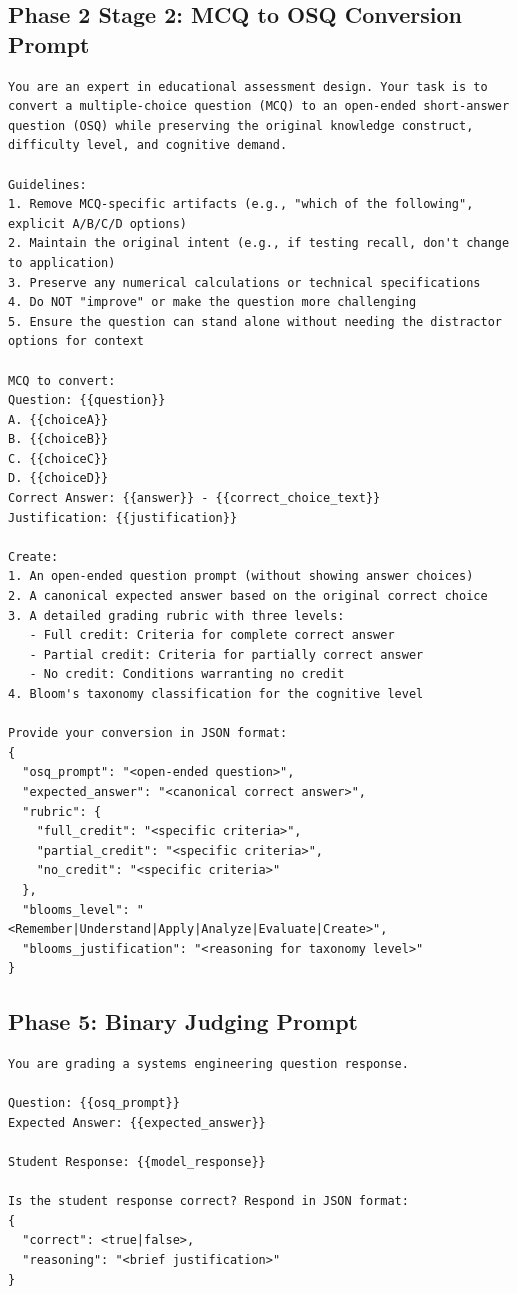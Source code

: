 \subsection{Phase 2 Stage 2: MCQ to OSQ Conversion Prompt}

\begin{lstlisting}[basicstyle=\small\ttfamily,breaklines=true]
You are an expert in educational assessment design. Your task is to convert a multiple-choice question (MCQ) to an open-ended short-answer question (OSQ) while preserving the original knowledge construct, difficulty level, and cognitive demand.

Guidelines:
1. Remove MCQ-specific artifacts (e.g., "which of the following", explicit A/B/C/D options)
2. Maintain the original intent (e.g., if testing recall, don't change to application)
3. Preserve any numerical calculations or technical specifications
4. Do NOT "improve" or make the question more challenging
5. Ensure the question can stand alone without needing the distractor options for context

MCQ to convert:
Question: {{question}}
A. {{choiceA}}
B. {{choiceB}}
C. {{choiceC}}
D. {{choiceD}}
Correct Answer: {{answer}} - {{correct_choice_text}}
Justification: {{justification}}

Create:
1. An open-ended question prompt (without showing answer choices)
2. A canonical expected answer based on the original correct choice
3. A detailed grading rubric with three levels:
   - Full credit: Criteria for complete correct answer
   - Partial credit: Criteria for partially correct answer
   - No credit: Conditions warranting no credit
4. Bloom's taxonomy classification for the cognitive level

Provide your conversion in JSON format:
{
  "osq_prompt": "<open-ended question>",
  "expected_answer": "<canonical correct answer>",
  "rubric": {
    "full_credit": "<specific criteria>",
    "partial_credit": "<specific criteria>",
    "no_credit": "<specific criteria>"
  },
  "blooms_level": "<Remember|Understand|Apply|Analyze|Evaluate|Create>",
  "blooms_justification": "<reasoning for taxonomy level>"
}
\end{lstlisting}

\subsection{Phase 5: Binary Judging Prompt}

\begin{lstlisting}[basicstyle=\small\ttfamily,breaklines=true]
You are grading a systems engineering question response.

Question: {{osq_prompt}}
Expected Answer: {{expected_answer}}

Student Response: {{model_response}}

Is the student response correct? Respond in JSON format:
{
  "correct": <true|false>,
  "reasoning": "<brief justification>"
}
\end{lstlisting}

